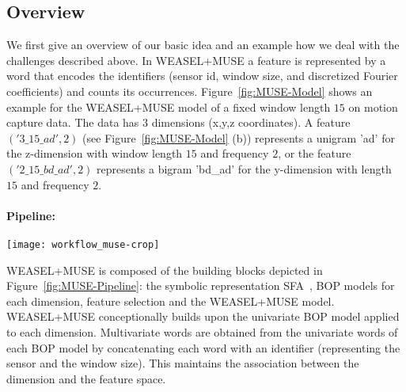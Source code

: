 \documentclass[sigconf]{acmart}
\begin{document}
\subsection{Overview}

We first give an overview of our basic idea and an example how we deal with the challenges described above. In WEASEL+MUSE a feature is represented by a word that encodes the identifiers (sensor id, window size, and discretized Fourier coefficients) and counts its occurrences. Figure~\ref{fig:MUSE-Model}  shows an example for the WEASEL+MUSE model of a fixed window length $15$ on motion capture data. The data has 3 dimensions (x,y,z coordinates). A feature $('3\_15\_ad', 2)$ (see Figure~\ref{fig:MUSE-Model} (b)) represents a unigram 'ad' for the z-dimension with window length $15$ and frequency $2$, or the feature $('2\_15\_bd\_ad', 2)$ represents a bigram 'bd\_ad' for the y-dimension with length $15$ and frequency $2$.

\paragraph{Pipeline:}

\begin{figure*}
	\texttt{[image: workflow\_muse-crop]}
	\caption{WEASEL+MUSE Pipeline: Feature extraction, univariate Bag-of-Patterns (BOP) models and WEASEL+MUSE.\label{fig:MUSE-Pipeline}}
\end{figure*}

WEASEL+MUSE is composed of the building blocks depicted in Figure~\ref{fig:MUSE-Pipeline}: the symbolic representation SFA~\cite{SchaferH12}, BOP models for each dimension, feature selection and the WEASEL+MUSE model. 
WEASEL+MUSE conceptionally builds upon the univariate BOP model applied to each dimension. Multivariate words are obtained from the univariate words of each BOP model by concatenating each word with an identifier (representing the sensor and the window size). This maintains the association between the dimension and the feature space. 
\end{document}
